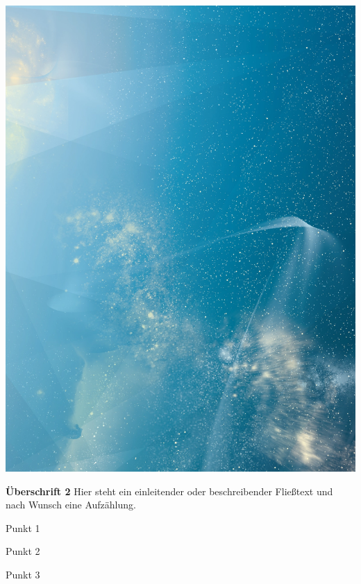 \begin{frame}
\begin{frame}
\mbox{\includegraphics[height=.5\paperheight, trim=0cm 14cm 0cm 0cm, clip=true]{./Resources/Images/SternenhimmelHochkant.jpg}}

\end{frame}
\clearpage


\begin{frame}

\begin{multicols}{2}
    \textbf{Überschrift 2}\newline
    Hier steht ein einleitender oder beschreibender Fließtext und nach Wunsch
    eine Aufzählung.

    Punkt 1

    Punkt 2

    Punkt 3


\end{multicols}
\end{frame}
\end{frame}
